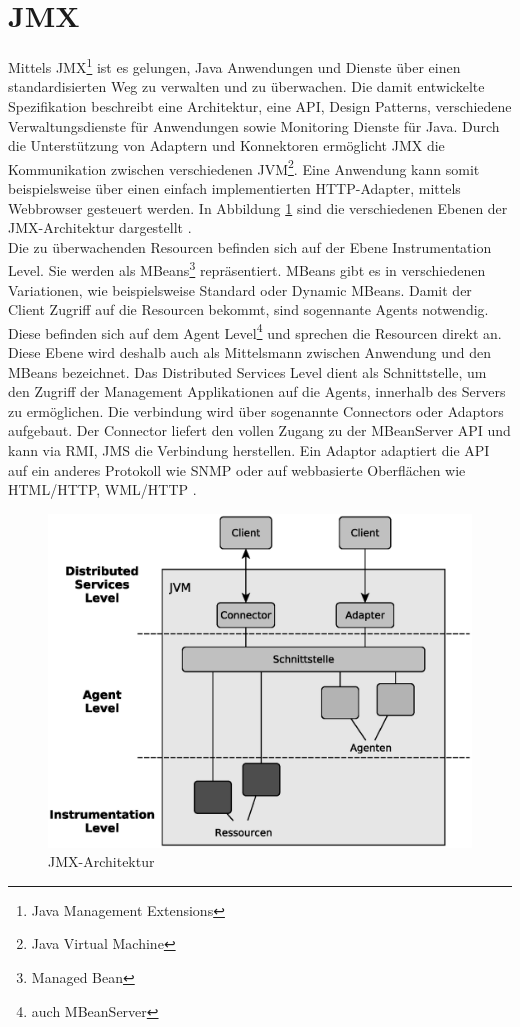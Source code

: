 \section{JMX}
Mittels JMX\footnote{Java Management Extensions} ist es gelungen, Java Anwendungen und Dienste über einen standardisierten Weg zu verwalten und zu \"uberwachen. Die damit entwickelte Spezifikation beschreibt eine Architektur, eine API, Design Patterns, verschiedene Verwaltungsdienste f\"ur Anwendungen sowie Monitoring Dienste f\"ur Java. Durch die Unterst\"utzung von Adaptern und Konnektoren erm\"oglicht JMX die Kommunikation zwischen verschiedenen JVM\footnote{Java Virtual Machine}. Eine Anwendung kann somit beispielsweise \"uber einen einfach implementierten HTTP-Adapter, mittels Webbrowser gesteuert werden. In Abbildung \ref{JMX} sind die verschiedenen Ebenen der JMX-Architektur dargestellt \cite{KKoehler}.\\
Die zu \"uberwachenden Resourcen befinden sich auf der Ebene Instrumentation Level. Sie werden als MBeans\footnote{Managed Bean} repräsentiert. MBeans gibt es in verschiedenen Variationen, wie beispielsweise Standard oder Dynamic MBeans. Damit der Client Zugriff auf die Resourcen bekommt, sind sogennante Agents notwendig. Diese befinden sich auf dem Agent Level\footnote{auch MBeanServer} und sprechen die Resourcen direkt an. Diese Ebene wird deshalb auch als Mittelsmann zwischen Anwendung und den MBeans bezeichnet. Das Distributed Services Level dient als Schnittstelle, um den Zugriff der Management Applikationen auf die Agents, innerhalb des Servers zu erm\"oglichen. Die verbindung wird \"uber sogenannte Connectors oder Adaptors aufgebaut. Der Connector liefert den vollen Zugang zu der MBeanServer API und kann via RMI, JMS die Verbindung herstellen. Ein Adaptor adaptiert die API auf ein anderes Protokoll wie SNMP oder auf webbasierte Oberfl\"achen wie HTML/HTTP, WML/HTTP \cite{JMXOracale}.

\begin{figure}[!htb]
\centering
\includegraphics[scale=0.8]{graphics/JMX.eps}
 \caption[JMX-Architektur]{JMX-Architektur \cite{wikiJMX}}
 \label{JMX}
\end{figure}

